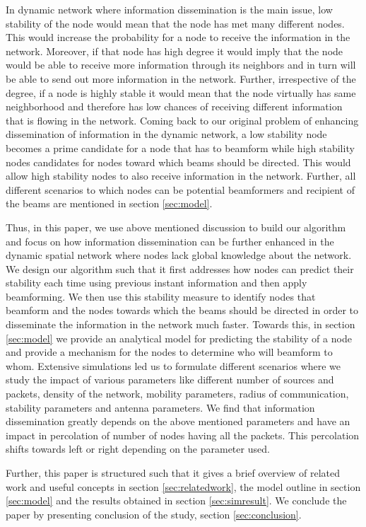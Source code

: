 \documentclass[preprint, twocolumn,5p]{elsarticle}
\begin{document}
In dynamic network where information dissemination is the main issue, low stability of the node would mean that the node has met many different nodes. This would increase the probability for a node to receive the information in the network. Moreover, if that node has high degree it would imply that the node would be able to receive more information through its neighbors and in turn will be able to send out more information in the network. Further, irrespective of the degree, if a node is highly stable it would mean that the node virtually has same neighborhood and therefore has low chances of receiving different information that is flowing in the network. Coming back to our original problem of enhancing dissemination of information in the dynamic network, a low stability node becomes a prime candidate for a node that has to beamform while high stability nodes candidates for nodes toward which beams should be directed. This would allow high stability nodes to also receive information in the network. Further, all different scenarios to which nodes can be potential beamformers and recipient of the beams are mentioned in section \ref{sec:model}.

Thus, in this paper, we use above mentioned discussion to build our algorithm and focus on how information dissemination can be further enhanced in the dynamic spatial network where nodes lack global knowledge about the network. We design our algorithm such that it first addresses how nodes can predict their stability each time using previous instant information and then apply beamforming. We then use this stability measure to identify nodes that beamform and the nodes towards which the beams should be directed in order to disseminate the information in the network much faster. Towards this, in section \ref{sec:model} we provide an analytical model for predicting the stability of a node and provide a mechanism for the nodes to determine who will beamform to whom. Extensive simulations led us to formulate different scenarios where we study the impact of various parameters like different number of sources and packets, density of the network, mobility parameters, radius of communication, stability parameters and antenna parameters. We find that information dissemination greatly depends on the above mentioned parameters and have an impact in percolation of number of nodes having all the packets. This percolation shifts towards left or right depending on the parameter used.

Further, this paper is structured such that it gives a brief overview of related work and useful concepts in section \ref{sec:relatedwork}, the model outline in section \ref{sec:model} and the results obtained in section \ref{sec:simresult}. We conclude the paper by presenting conclusion of the study, section \ref{sec:conclusion}.
\end{document}
